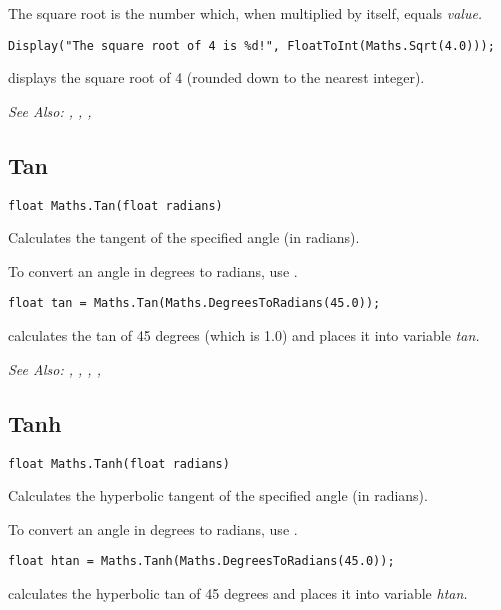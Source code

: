 The square root is the number which, when multiplied by itself, equals \it{value}.

\begin{verbatim}
Display("The square root of 4 is %d!", FloatToInt(Maths.Sqrt(4.0)));
\end{verbatim}
displays the square root of 4 (rounded down to the nearest integer).

\it{See Also:} ,
,
, 


\subsection{Tan}\label{Maths.Tan}%

\begin{verbatim}
float Maths.Tan(float radians)
\end{verbatim}
Calculates the tangent of the specified angle (in radians).

To convert an angle in degrees to radians, use .

\begin{verbatim}
float tan = Maths.Tan(Maths.DegreesToRadians(45.0));
\end{verbatim}
calculates the tan of 45 degrees (which is 1.0) and places it into variable \it{tan}.

\it{See Also:} ,
,
,
, 


\subsection{Tanh}\label{Maths.Tanh}%

\begin{verbatim}
float Maths.Tanh(float radians)
\end{verbatim}
Calculates the hyperbolic tangent of the specified angle (in radians).

To convert an angle in degrees to radians, use .

\begin{verbatim}
float htan = Maths.Tanh(Maths.DegreesToRadians(45.0));
\end{verbatim}
calculates the hyperbolic tan of 45 degrees and places it into variable \it{htan}.

